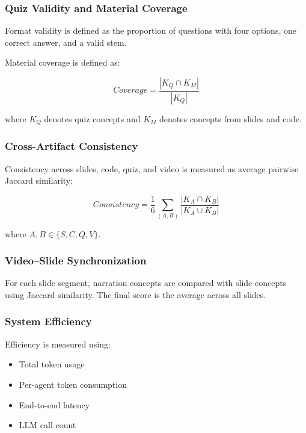 \documentclass[10pt,journal,compsoc]{IEEEtran}
\begin{document}
\subsubsection{Quiz Validity and Material Coverage}

Format validity is defined as the proportion of questions with four options, one correct answer, and a valid stem.

Material coverage is defined as:

\begin{equation}
Coverage = \frac{|K_Q \cap K_M|}{|K_Q|}
\end{equation}

where $K_Q$ denotes quiz concepts and $K_M$ denotes concepts from slides and code.

\subsubsection{Cross-Artifact Consistency}

Consistency across slides, code, quiz, and video is measured as average pairwise Jaccard similarity:

\begin{equation}
Consistency = \frac{1}{6} \sum_{(A,B)} \frac{|K_A \cap K_B|}{|K_A \cup K_B|}
\end{equation}

where $A,B \in \{S,C,Q,V\}$.

\subsubsection{Video--Slide Synchronization}

For each slide segment, narration concepts are compared with slide concepts using Jaccard similarity. The final score is the average across all slides.

\subsubsection{System Efficiency}

Efficiency is measured using:

\begin{itemize}
    \item Total token usage
    \item Per-agent token consumption
    \item End-to-end latency
    \item LLM call count
\end{itemize}
\end{document}

